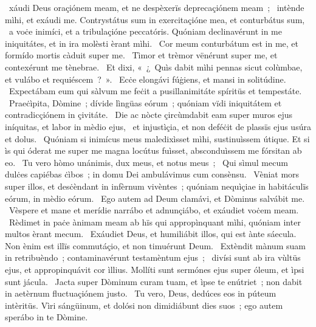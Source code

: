 { }
{%
~xáudi Deus oraçiónem meam, et ne despèxerïs deprecaçiónem meam~; 
~intènde mìhi, et exáudi me. Contrystátus sum in exercitaçióne mea, et conturbátus sum, 
~a voċe inimíci, et a tribulaçióne peccatóris. Quóniam declinavérunt in me iniquitátes, et in ira molèsti èrant mìhi. 
~Cor meum conturbátum est in me, et formído mortis càduit super me. 
~Tìmor et trèmor vënérunt super me, et contexérunt me tènebrae. 
~Et dixi, «~¿~Quìs dabit mìhi pennas sicut colùmbae, et vulábo et requiéscem~?~». 
~Ecċe elongávi fúġiens, et mansi in solitúdine. 
~Expectábam eum qui sàlvum me feċit a pusillanimitáte spíritüs et tempestáte. 
~Praeċìpita, Dòmine~; dívide lìngüas eórum~; quóniam vïdi iniquitátem et contradicçiónem in çivitáte. 
~Die ac nòcte çircùmdabit eam super muros ejus iníquitas, et labor in mèdio ejus, 
~et injustìçia, et non deféċit de plassïs ejus usúra et dolus. 
~Quóniam si inimícus meus maledixìsset mìhi, sustinuìssem útique. Et si ìs qui óderat me super me magna locútus fuìsset, absconduìssem me fórsitan ab eo. 
~Tu vero hòmo unánimis, dux meus, et notus meus~; 
~Qui sìmul mecum dulċes capiébas ċìbos~; in domu Dei ambulávimus cum consènsu. 
~Vèniat mors super illos, et desċèndant in infèrnum vivèntes~; quóniam nequìçiae in habitáculïs eórum, in mèdio eórum. 
~Ego autem ad Deum clamávi, et Dòminus salvábit me. 
~Vèspere et mane et merídie narrábo et adnunçiábo, et exáudiet voċem meam. 
~Rèdimet in paċe ànimam meam ab hïs qui appropìnquant mìhi, quóniam inter multos èrant mecum. 
~Exáudiet Deus, et humiliábit illos, qui est ànte sáecula. Non ènim est illïs commutáçio, et non timuérunt Deum. 
~Extèndit mànum suam in retribuèndo~; contaminavérunt testamèntum ejus~; 
~divísi sunt ab ira vùltüs ejus, et appropinquávit cor ìllius. Mollíti sunt sermónes ejus super óleum, et ìpsi sunt jácula. 
~Jacta super Dòminum curam tuam, et ìpse te enútriet~; non dabit in aetèrnum fluctuaçiónem justo. 
~Tu vero, Deus, dedúces eos in púteum intèritüs. Vìri sángüinum, et dolósi non dimidiábunt dies suos~; ego autem sperábo in te Dòmine. 
}
